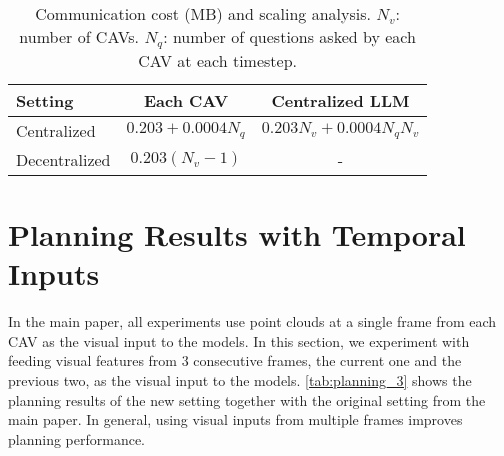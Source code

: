 \begin{table}[!t]
\small
\setlength{\tabcolsep}{3pt}
\begin{center}
\begin{tabular}{l c c }
  \hline
  \hline
  Setting  & Each CAV & Centralized LLM \\
  \hline
  \hline
  Centralized  & $0.203 + 0.0004N_q$ & $0.203N_v + 0.0004N_qN_v$ \\
  Decentralized      & $0.203(N_v - 1)$ & -  \\
  \hline
\end{tabular}
\vspace{-5pt}
\caption{
Communication cost (MB) and scaling analysis. $N_v$: number of CAVs. $N_q$: number of questions asked by each CAV at each timestep.
}
\label{tab:communication_cost_supp}
\end{center}
\vspace{-10pt}
\end{table}


  
  
\section{Planning Results with Temporal Inputs}
In the main paper, all experiments use point clouds at a single frame from each CAV as the visual input to the models. In this section, we experiment with feeding visual features from $3$ consecutive frames, the current one and the previous two, as the visual input to the models. \cref{tab:planning_3} shows the planning results of the new setting together with the original setting from the main paper. In general, using visual inputs from multiple frames improves planning performance. 


